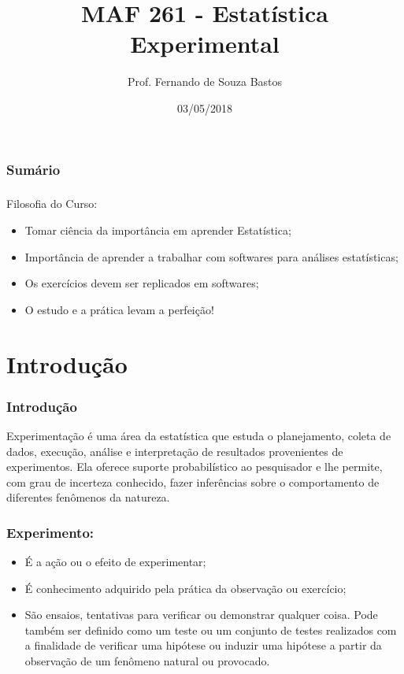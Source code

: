 \documentclass[14pt,aspectratio=1610]{beamer}
\title{MAF 261 - Estatística Experimental}
\author{Prof. Fernando de Souza Bastos}
\institute{Instituto de Ciências Exatas e Tecnológicas\texorpdfstring{\\ Universidade Federal de Viçosa}{}\texorpdfstring{\\ Campus UFV - Florestal}{}}
\date{03/05/2018}
\begin{document}
\frame{\titlepage}

\begin{frame}{}
\frametitle{\bf Sumário}
\tableofcontents
\end{frame}


\begin{frame}{}
\frametitle{}

\begin{block}{Filosofia do Curso:}
\begin{itemize}
    \item Tomar ciência da importância em aprender Estatística;\pause
    \item Importância de aprender a trabalhar com softwares para análises estatísticas;\pause
    \item Os exercícios devem ser replicados em softwares;\pause
    \item O estudo e a prática levam a perfeição!
\end{itemize}
\end{block}
\end{frame}
\section{Introdução}
\begin{frame}{}
\frametitle{Introdução}
\begin{block}{}
\justifying
Experimentação é uma área da estatística que estuda o planejamento, coleta de dados, execução, análise e interpretação de resultados provenientes de experimentos. 
Ela oferece suporte probabilístico ao pesquisador e lhe permite, com grau de incerteza conhecido, fazer inferências sobre o comportamento de diferentes fenômenos 
da natureza.
\end{block}
\end{frame}

\begin{frame}{}
\frametitle{Experimento:}
\begin{block}{}
\justifying
\begin{itemize}
\item É a ação ou o efeito de experimentar; \pause
\item É conhecimento adquirido pela prática da observação ou exercício; \pause
\item São ensaios, tentativas para verificar ou demonstrar qualquer coisa. Pode também ser definido como um teste ou um conjunto de testes realizados com a finalidade 
de verificar uma hipótese ou induzir uma hipótese a partir da observação de um fenômeno natural ou provocado. 
\end{itemize}
\end{block}
\end{frame}
\end{document}
